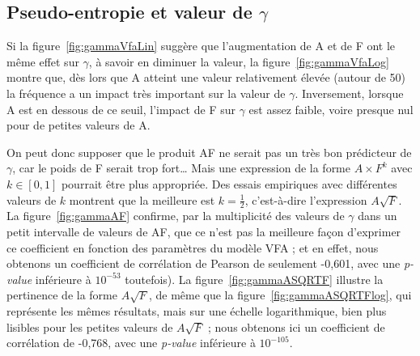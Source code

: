 	\subsection{Pseudo-entropie et valeur de $\gamma$}
	Si la figure~\ref{fig:gammaVfaLin} suggère que l'augmentation de A et de F ont le même effet sur $\gamma$, à savoir en diminuer la valeur, la figure~\ref{fig:gammaVfaLog} montre que, dès lors que A atteint une valeur relativement élevée (autour de 50) la fréquence a un impact très important sur la valeur de $\gamma$. Inversement, lorsque A est en dessous de ce seuil, l'impact de F sur $\gamma$ est assez faible, voire presque nul pour de petites valeurs de A.
	
	On peut donc supposer que le produit AF ne serait pas un très bon prédicteur de $\gamma$, car le poids de F serait trop fort\ldots{} Mais une expression de la forme $A\times{}F^{k}$ avec $k \in [0,1]$ pourrait être plus appropriée. Des essais empiriques avec différentes valeurs de $k$ montrent que la meilleure est $k = \frac{1}{2}$, c'est-à-dire l'expression $A\sqrt{F}$. La figure~\ref{fig:gammaAF} confirme, par la multiplicité des valeurs de $\gamma$ dans un petit intervalle de valeurs de AF, que ce n'est pas la meilleure façon d'exprimer ce coefficient en fonction des paramètres du modèle VFA ; et en effet, nous obtenons un coefficient de corrélation de Pearson de seulement -0,601, avec une \emph{p-value} inférieure à $10^{-53}$ toutefois). La figure~\ref{fig:gammaASQRTF} illustre la pertinence de la forme $A\sqrt{F}$, de même que la figure~\ref{fig:gammaASQRTFlog}, qui représente les mêmes résultats, mais sur une échelle logarithmique, bien plus lisibles pour les petites valeurs de $A\sqrt{F}$ ; nous obtenons ici un coefficient de corrélation de -0,768, avec une \emph{p-value} inférieure à $10^{-105}$.
	

